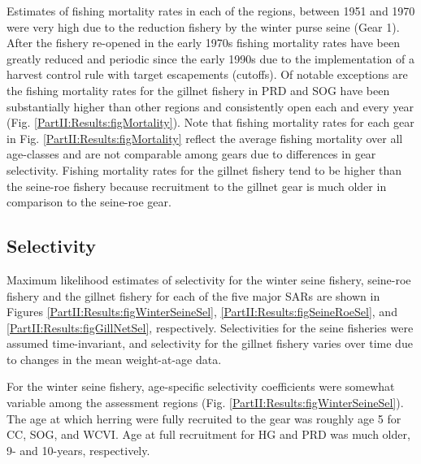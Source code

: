 Estimates of fishing mortality rates in each of the regions, between 1951 and 1970 were very high due to the reduction fishery by the winter purse seine (Gear 1).  After the fishery re-opened in the early 1970s fishing mortality rates have been greatly reduced and periodic since the early 1990s due to the implementation of a harvest control rule with target escapements (cutoffs).  Of notable exceptions are the fishing mortality rates for the gillnet fishery in PRD  and SOG have been substantially higher than other regions and consistently open each and every year (Fig. \ref{PartII:Results:figMortality}). Note that fishing mortality rates for each gear in Fig. \ref{PartII:Results:figMortality} reflect the average fishing mortality over all age-classes and are not comparable among gears due to differences in gear selectivity. Fishing mortality rates for the gillnet fishery tend to be higher than the seine-roe fishery because recruitment to the gillnet gear is much older in comparison to the seine-roe gear.





\subsection{Selectivity}

Maximum likelihood estimates of selectivity for the winter seine fishery, seine-roe fishery and the gillnet fishery for each of the five major SARs are shown in Figures \ref{PartII:Results:figWinterSeineSel}, \ref{PartII:Results:figSeineRoeSel}, and \ref{PartII:Results:figGillNetSel}, respectively.  Selectivities for the seine fisheries were assumed time-invariant, and selectivity for the gillnet fishery varies over time due to changes in the mean weight-at-age data.

For the winter seine fishery, age-specific selectivity coefficients were somewhat variable among the assessment regions (Fig. \ref{PartII:Results:figWinterSeineSel}).  The age at which herring were fully recruited to the gear was roughly age 5 for CC, SOG, and WCVI.  Age at full recruitment for HG and PRD was much older, 9- and 10-years, respectively.


